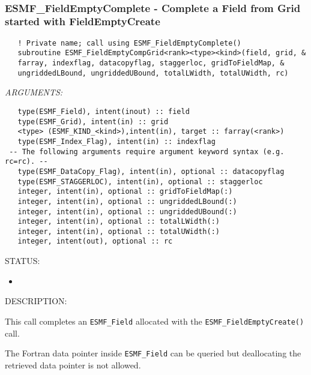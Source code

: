  
\mbox{}\hrulefill\ 
 
\subsubsection [ESMF\_FieldEmptyComplete] {ESMF\_FieldEmptyComplete - Complete a Field from Grid started with FieldEmptyCreate }


   
\begin{verbatim}   ! Private name; call using ESMF_FieldEmptyComplete() 
   subroutine ESMF_FieldEmptyCompGrid<rank><type><kind>(field, grid, & 
   farray, indexflag, datacopyflag, staggerloc, gridToFieldMap, & 
   ungriddedLBound, ungriddedUBound, totalLWidth, totalUWidth, rc) 
   \end{verbatim}{\em ARGUMENTS:}
\begin{verbatim}   type(ESMF_Field), intent(inout) :: field 
   type(ESMF_Grid), intent(in) :: grid 
   <type> (ESMF_KIND_<kind>),intent(in), target :: farray(<rank>) 
   type(ESMF_Index_Flag), intent(in) :: indexflag 
 -- The following arguments require argument keyword syntax (e.g. rc=rc). --
   type(ESMF_DataCopy_Flag), intent(in), optional :: datacopyflag 
   type(ESMF_STAGGERLOC), intent(in), optional :: staggerloc 
   integer, intent(in), optional :: gridToFieldMap(:) 
   integer, intent(in), optional :: ungriddedLBound(:) 
   integer, intent(in), optional :: ungriddedUBound(:) 
   integer, intent(in), optional :: totalLWidth(:) 
   integer, intent(in), optional :: totalUWidth(:) 
   integer, intent(out), optional :: rc 
   \end{verbatim}
{\sf STATUS:}
   \begin{itemize} 
   \item{} 
   \end{itemize} 
   
{\sf DESCRIPTION:\\ }

 
   This call completes an {\tt ESMF\_Field} allocated with the 
   {\tt ESMF\_FieldEmptyCreate()} call. 
   
   The Fortran data pointer inside {\tt ESMF\_Field} can be queried but deallocating 
   the retrieved data pointer is not allowed. 
   
